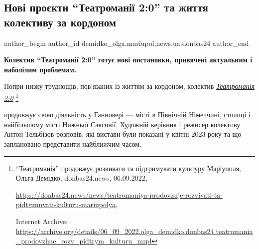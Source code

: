  
 
 
 
 
 
\subsection{Нові проєкти \enquote{Театроманії 2:0} та життя колективу за кордоном}
\label{sec:04_05_2023.stz.news.ua.donbas24.1.novi_proekty_teatromanii_zhyttja_za_kordonom}
 
\ifcmt
 author_begin
   author_id demidko_olga.mariupol,news.ua.donbas24
 author_end
\fi


\textbf{Колектив \enquote{Театроманії 2:0} готує нові постановки, привячені актуальним і наболілим проблемам.}

Попри низку труднощів, пов'язаних із життям за кордоном, колектив \href{https://archive.org/details/06_09_2022.olga_demidko.donbas24.teatromania_prodovzhue_rozv_pidtrym_kulturu_mrpl}{\emph{Театроманія 2:0}}%
\footnote{\enquote{Театроманія} продовжує розвивати та підтримувати культуру Маріуполя, Ольга Демідко, donbas24.news, 06.09.2022, %
\par\url{https://donbas24.news/news/teatromaniya-prodovzuje-rozvivati-ta-pidtrimuvati-kulturu-mariupolya}, \par%
Internet Archive: \url{https://archive.org/details/06_09_2022.olga_demidko.donbas24.teatromania_prodovzhue_rozv_pidtrym_kulturu_mrpl}%
}

продовжує свою діяльність у Ганновері — місті в Північній Німеччині,
столиці і найбільшому місті Нижньої Саксонії. Художній керівник і режисер
колективу Антон Тельбізов розповів, які вистави були показані у квітні 2023
року та що заплановано представити найближчим часом.


